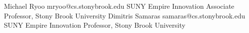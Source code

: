 
\begin{experiences}

\researchexperience
    {Michael Ryoo} {mryoo@cs.stonybrook.edu}
    {SUNY Empire Innovation Associate Professor, Stony Brook University} {}
    {}
  \emptySeparator
\researchexperience
    {Dimitris Samaras} {samaras@cs.stonybrook.edu}
    {SUNY Empire Innovation Professor, Stony Brook University} {}
    {}
  \emptySeparator
 
\end{experiences}
\vspace{-4mm}
